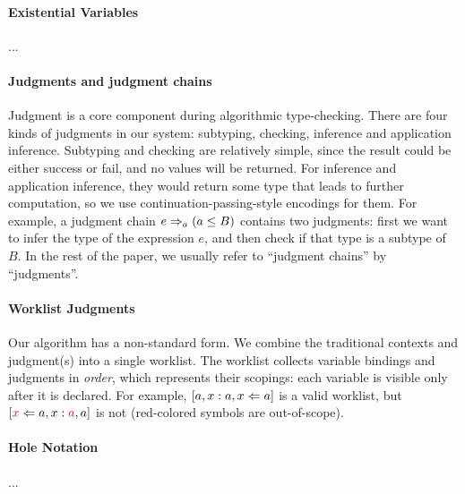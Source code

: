 \paragraph{Existential Variables} ...

\paragraph{Judgments and judgment chains} Judgment is a core component during algorithmic type-checking.
There are four kinds of judgments in our system: subtyping, checking, inference and application inference.
Subtyping and checking are relatively simple, since the result could be either success or fail, and no values will be returned.
For inference and application inference, they would return some type that leads to further computation, so we use continuation-passing-style encodings for them.
For example, a judgment chain $e \Rightarrow_a (a \le B)$ contains two judgments: first we want to infer the type of the expression $e$, and then check if that type is a subtype of $B$.
In the rest of the paper, we usually refer to ``judgment chains'' by ``judgments''.

\paragraph{Worklist Judgments} Our algorithm has a non-standard form.
We combine the traditional contexts and judgment(s) into a single worklist.
The worklist collects variable bindings and judgments in \emph{order}, which represents their scopings:
each variable is visible only after it is declared.
For example, $[a,x:a,x \Leftarrow a]$ is a valid worklist, but $[\textcolor{red}{x} \Leftarrow a, x:\textcolor{red}{a},a]$ is not (red-colored symbols are out-of-scope).

\paragraph{Hole Notation}...

